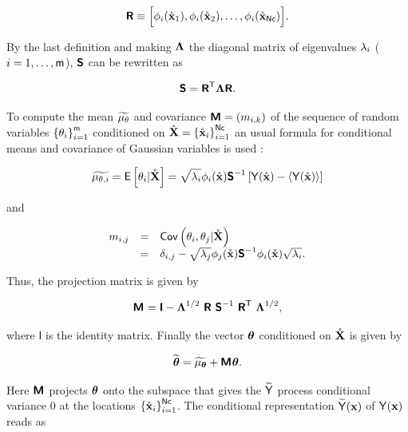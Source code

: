 \begin{equation}
 \R \equiv \Big[ \avei(\pvx_{1}),\avei(\pvx_{2}),\dots,\avei(\pvx_{\nc}) \Big].
 \label{mR}
\end{equation}

\noindent By the last definition and making $\boldsymbol{\Lambda}$ the diagonal matrix of eigenvalues $\lambda_{i}$ ($i=1,\dots,\mathsf{m}$), $\boldsymbol{\mathsf{S}}$ can be rewritten as

\begin{equation*}
 \boldsymbol{\mathsf{S}} = \boldsymbol{\mathsf{R}}^{\mathsf{T}}\boldsymbol{\Lambda}\boldsymbol{\mathsf{R}}.
\end{equation*}

To compute the mean $\widetilde{{\mu_{\theta}}}$ and covariance $\boldsymbol{\mathsf{M}}_{} = (m_{i,k})$ of the sequence of random variables $\left\{ \theta_{i} \right\}_{i=1}^{\mathsf{m}}$ conditioned on $\mathring{\mathbf{X}} = \left\{ \mathring{\mathbf{x}}_{i}\right\}_{i=1}^{\mathsf{Nc}}$ an usual formula for conditional means and covariance of Gaussian variables is used \citep{tong1990multivariate}:

\begin{equation}
 \widetilde{{\mu_{\theta,i}}} = \mathsf{E}\left[ \theta_{i} | \mathring{\mathbf{X}} \right] = \sqrt{\lambda_{i}}\phi_{i}(\mathring{\mathbf{x}}) \boldsymbol{\mathsf{S}}^{-1} \left[ \mathsf{Y}(\mathring{\mathbf{x}}) - \langle {\mathsf{Y}(\mathring{\mathbf{x}})} \rangle \right]
\end{equation}

\noindent and

\begin{equation}
 \begin{array}{rcl}
  m_{i,j} &=& \covar{\theta_{i}}{\theta_{j}|\pX}\\
          &=& \delta_{i,j} - \sqrt{\avaj}\avej(\pvx) \mS^{-1} \avei(\pvx)\sqrt{\avai}.
 \end{array}
\label{mmatrix}
\end{equation}

\noindent Thus, the projection matrix is given by

\begin{equation}
 \boldsymbol{\mathsf{M}}_{} = \boldsymbol{\mathsf{I}} - \boldsymbol{\Lambda}^{1/2}\ \boldsymbol{\mathsf{R}}\ \boldsymbol{\mathsf{S}}^{-1}\ \boldsymbol{\mathsf{R}}^{\mathsf{T}} \ \boldsymbol{\Lambda}^{1/2},
\end{equation}

\noindent where $\boldsymbol{\mathsf{I}}$ is the identity matrix.
Finally the vector $\boldsymbol{\theta}$ conditioned on $\mathring{\mathbf{X}}$ is given by

\begin{equation}
 \widetilde{\boldsymbol{\theta}} = \widetilde{{\mu_{\boldsymbol{\theta}}}} + \boldsymbol{\mathsf{M}}_{} \boldsymbol{\theta}.
\end{equation}

\noindent Here $\boldsymbol{\mathsf{M}}_{}$ projects $\boldsymbol{\theta}$ onto the subspace that gives the $\widetilde{\mathsf{Y}}$ process conditional variance 0 at the locations $\left\{ \mathring{\mathbf{x}}_{i}\right\}_{i=1}^{\mathsf{Nc}}$.
The conditional representation $\widetilde{\mathsf{Y}}\!\left(\mathbf{x}\right)$ of ${\mathsf{Y}\!\left(\mathbf{x}\right)}$ reads as

